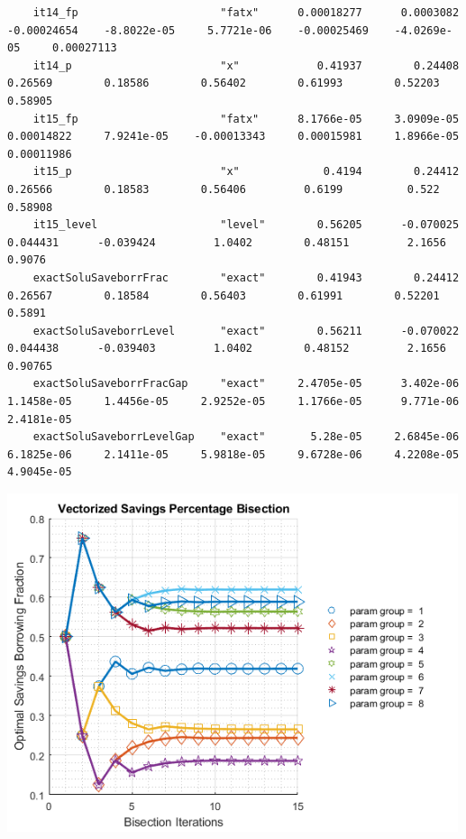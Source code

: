 \documentclass[
]{book}
\begin{document}
\begin{verbatim}
    it14_fp                      "fatx"      0.00018277      0.0003082    -0.00024654    -8.8022e-05     5.7721e-06    -0.00025469    -4.0269e-05     0.00027113
    it14_p                       "x"            0.41937        0.24408        0.26569        0.18586        0.56402        0.61993        0.52203        0.58905
    it15_fp                      "fatx"      8.1766e-05     3.0909e-05     0.00014822     7.9241e-05    -0.00013343     0.00015981     1.8966e-05     0.00011986
    it15_p                       "x"             0.4194        0.24412        0.26566        0.18583        0.56406         0.6199          0.522        0.58908
    it15_level                   "level"        0.56205      -0.070025       0.044431      -0.039424         1.0402        0.48151         2.1656         0.9076
    exactSoluSaveborrFrac        "exact"        0.41943        0.24412        0.26567        0.18584        0.56403        0.61991        0.52201         0.5891
    exactSoluSaveborrLevel       "exact"        0.56211      -0.070022       0.044438      -0.039403         1.0402        0.48152         2.1656        0.90765
    exactSoluSaveborrFracGap     "exact"     2.4705e-05      3.402e-06     1.1458e-05     1.4456e-05     2.9252e-05     1.1766e-05      9.771e-06     2.4181e-05
    exactSoluSaveborrLevelGap    "exact"       5.28e-05     2.6845e-06     6.1825e-06     2.1411e-05     5.9818e-05     9.6728e-06     4.2208e-05     4.9045e-05
\end{verbatim}

\includegraphics[width=5.20833in,height=\textheight]{img/fx_optim_bisec_savezrone_images/figure_0.png}
\end{document}
